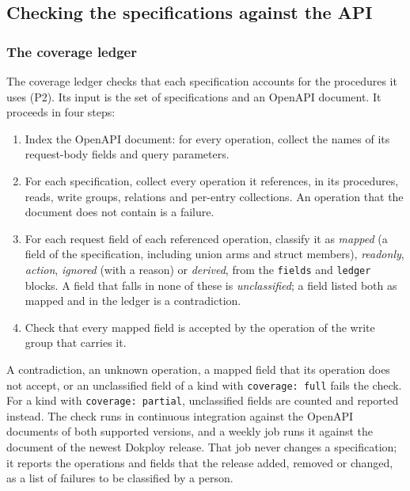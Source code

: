 \subsection{Checking the specifications against the API}\label{sec:7.1}

\subsubsection*{The coverage ledger}

The coverage ledger checks that each specification accounts for the procedures it uses (P2). Its
input is the set of specifications and an OpenAPI document. It proceeds in four steps:

\begin{enumerate}
\def\labelenumi{\arabic{enumi}.}
\item
  Index the OpenAPI document: for every operation, collect the names of its request-body fields and
  query parameters.
\item
  For each specification, collect every operation it references, in its procedures, reads, write
  groups, relations and per-entry collections. An operation that the document does not contain is a
  failure.
\item
  For each request field of each referenced operation, classify it as \emph{mapped} (a field of the
  specification, including union arms and struct members), \emph{readonly}, \emph{action}, \emph{ignored} (with a
  reason) or \emph{derived}, from the \texttt{fields} and \texttt{ledger} blocks. A field that falls in none of these
  is \emph{unclassified}; a field listed both as mapped and in the ledger is a contradiction.
\item
  Check that every mapped field is accepted by the operation of the write group that carries it.
\end{enumerate}

A contradiction, an unknown operation, a mapped field that its operation does not accept, or an
unclassified field of a kind with \texttt{coverage:\ full} fails the check. For a kind with \texttt{coverage:\ partial}, unclassified fields are counted and reported instead. The check runs in continuous
integration against the OpenAPI documents of both supported versions, and a weekly job runs it
against the document of the newest Dokploy release. That job never changes a specification; it
reports the operations and fields that the release added, removed or changed, as a list of failures
to be classified by a person.

